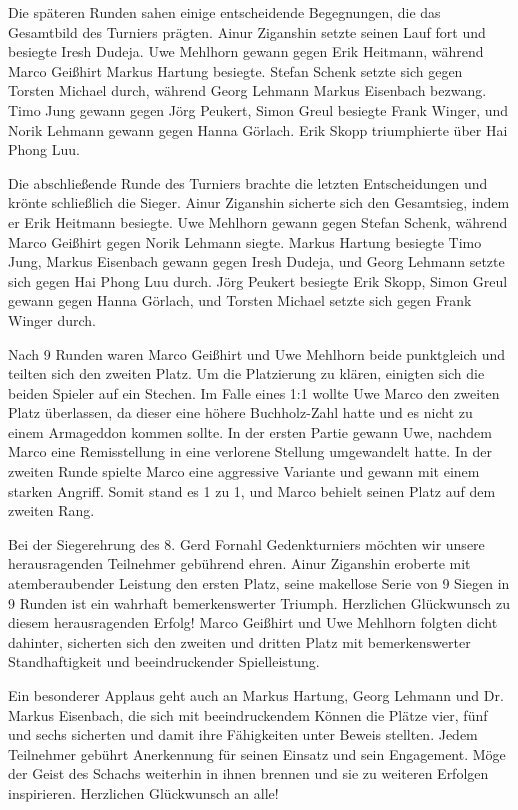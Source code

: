 \documentclass[a4paper,ngerman]{tui-algo-seminar}
\begin{document}
Die späteren Runden sahen einige entscheidende Begegnungen, die das Gesamtbild des Turniers prägten. Ainur Ziganshin setzte seinen Lauf fort und besiegte Iresh Dudeja. Uwe Mehlhorn gewann gegen Erik Heitmann, während Marco Geißhirt Markus Hartung besiegte. Stefan Schenk setzte sich gegen Torsten Michael durch, während Georg Lehmann Markus Eisenbach bezwang. Timo Jung gewann gegen Jörg Peukert, Simon Greul besiegte Frank Winger, und Norik Lehmann gewann gegen Hanna Görlach. Erik Skopp triumphierte über Hai Phong Luu.

Die abschließende Runde des Turniers brachte die letzten Entscheidungen und krönte schließlich die Sieger. Ainur Ziganshin sicherte sich den Gesamtsieg, indem er Erik Heitmann besiegte. Uwe Mehlhorn gewann gegen Stefan Schenk, während Marco Geißhirt gegen Norik Lehmann siegte. Markus Hartung besiegte Timo Jung, Markus Eisenbach gewann gegen Iresh Dudeja, und Georg Lehmann setzte sich gegen Hai Phong Luu durch. Jörg Peukert besiegte Erik Skopp, Simon Greul gewann gegen Hanna Görlach, und Torsten Michael setzte sich gegen Frank Winger durch.

Nach 9 Runden waren Marco Geißhirt und Uwe Mehlhorn beide punktgleich und teilten sich den zweiten Platz. Um die Platzierung zu klären, einigten sich die beiden Spieler auf ein Stechen. Im Falle eines 1:1 wollte Uwe Marco den zweiten Platz überlassen, da dieser eine höhere Buchholz-Zahl hatte und es nicht zu einem Armageddon kommen sollte. In der ersten Partie gewann Uwe, nachdem Marco eine Remisstellung in eine verlorene Stellung umgewandelt hatte. In der zweiten Runde spielte Marco eine aggressive Variante und gewann mit einem starken Angriff. Somit stand es 1 zu 1, und Marco behielt seinen Platz auf dem zweiten Rang. ~\cite{marco1}

Bei der Siegerehrung des 8. Gerd Fornahl Gedenkturniers möchten wir unsere herausragenden Teilnehmer gebührend ehren. Ainur Ziganshin eroberte mit atemberaubender Leistung den ersten Platz, seine makellose Serie von 9 Siegen in 9 Runden ist ein wahrhaft bemerkenswerter Triumph. Herzlichen Glückwunsch zu diesem herausragenden Erfolg! Marco Geißhirt und Uwe Mehlhorn folgten dicht dahinter, sicherten sich den zweiten und dritten Platz mit bemerkenswerter Standhaftigkeit und beeindruckender Spielleistung.

Ein besonderer Applaus geht auch an Markus Hartung, Georg Lehmann und Dr. Markus Eisenbach, die sich mit beeindruckendem Können die Plätze vier, fünf und sechs sicherten und damit ihre Fähigkeiten unter Beweis stellten. Jedem Teilnehmer gebührt Anerkennung für seinen Einsatz und sein Engagement. Möge der Geist des Schachs weiterhin in ihnen brennen und sie zu weiteren Erfolgen inspirieren. Herzlichen Glückwunsch an alle!
\end{document}
